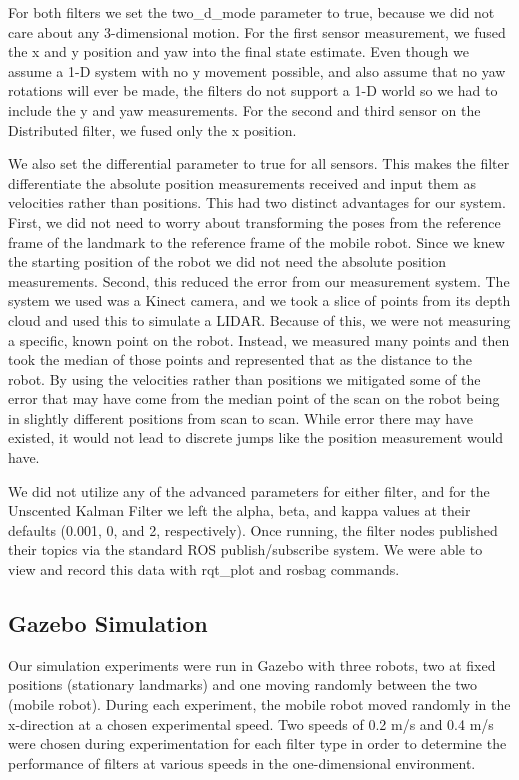 \documentclass[conference]{IEEEtran} \usepackage[T1]{fontenc} \usepackage[backend=biber, style=ieee]{biblatex}
\begin{document}
For both filters we set the two\_d\_mode parameter to true, because we did not care about any 3-dimensional motion. For the first
sensor measurement, we fused the x and y position and yaw into the final state estimate. Even though we assume a 1-D
system with no y movement possible, and also assume that no yaw rotations will ever be made, the filters do not support
a 1-D world so we had to include the y and yaw measurements. For the second and third sensor on the Distributed filter,
we fused only the x position.

We also set the differential parameter to true for all sensors. This makes the filter differentiate the absolute
position measurements received and input them as velocities rather than positions. This had two distinct advantages for
our system. First, we did not need to worry about transforming the poses from the reference frame of the landmark to the
reference frame of the mobile robot. Since we knew the starting position of the robot we did not need the absolute
position measurements. Second, this reduced the error from our measurement system. The system we used was a Kinect
camera, and we took a slice of points from its depth cloud and used this to simulate a LIDAR. Because of this, we were
not measuring a specific, known point on the robot. Instead, we measured many points and then took the median of those
points and represented that as the distance to the robot. By using the velocities rather than positions we mitigated
some of the error that may have come from the median point of the scan on the robot being in slightly different
positions from scan to scan. While error there may have existed, it would not lead to discrete jumps like the position
measurement would have.

We did not utilize any of the advanced parameters for either filter, and for the Unscented Kalman Filter we left the
alpha, beta, and kappa values at their defaults (0.001, 0, and 2, respectively). Once running, the filter nodes
published their topics via the standard ROS publish/subscribe system. We were able to view and record this data 
with rqt\_plot and rosbag commands.


\subsection{Gazebo Simulation} \label{Gazebo Simulation} Our simulation experiments were run in Gazebo with three
robots, two at fixed positions (stationary landmarks) and one moving randomly between the two (mobile robot). During
each experiment, the mobile robot moved randomly in the x-direction at a chosen experimental speed. Two speeds of 0.2
m/s and 0.4 m/s were chosen during experimentation for each filter type in order to determine the performance of filters
at various speeds in the one-dimensional environment.
\end{document}

